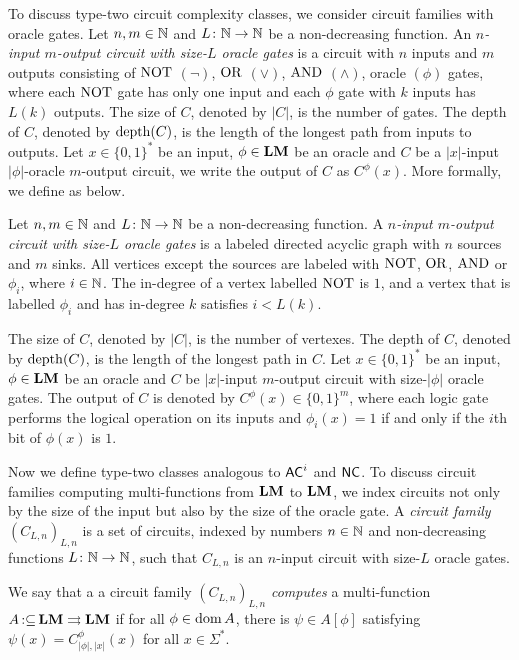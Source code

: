 \documentclass[envcountsame,orivec,oribibl]{llncs}
\newcommand{\pcolon}{\mathpunct{\,:\subseteq}}
\begin{document}
To discuss type-two circuit complexity classes,
we consider circuit families with oracle gates.
Let $n, m \in \mathbb N$ and $L \colon \mathbb N \to \mathbb N$ be a non-decreasing function.
An \emph{$n$-input $m$-output circuit with size-$L$ oracle gates} is a circuit with
$n$ inputs and $m$ outputs consisting of 
$\mathrm{NOT}$ $(\neg)$, $\mathrm{OR}$ $(\vee)$, $\mathrm{AND}$ $(\wedge)$, oracle $(\phi)$ gates,
where each $\mathrm{NOT}$ gate has only one input and each $\phi$ gate with $k$ inputs
has $L(k)$ outputs.
The size of $C$, denoted by $|C|$, is the number of gates.
The depth of $C$, denoted by $\mathop{\rm depth}(C)$, is the length of the longest path
from inputs to outputs.
Let $x \in \{0, 1\}^*$ be an input, $\phi \in \mathbf{LM}$ be an oracle and
$C$ be a $|x|$-input $|\phi|$-oracle $m$-output circuit,
we write the output of $C$ as $C^\phi(x)$.
More formally, we define as below.

\begin{definition}
Let $n, m \in \mathbb N$ and $L \colon \mathbb N \to \mathbb N$ be a non-decreasing function.
A \emph{$n$-input $m$-output circuit with size-$L$ oracle gates} is 
a labeled directed acyclic graph with $n$ sources and $m$ sinks.
All vertices except the sources are labeled with $\mathrm{NOT}$, $\mathrm{OR}$, $\mathrm{AND}$ 
or $\phi _i$, where $i \in \mathbb N$.
The in-degree of a vertex labelled $\mathrm{NOT}$ is $1$, and
a vertex that is labelled $\phi _i$ and has in-degree $k$ 
satisfies $i < L(k)$.

The size of $C$, denoted by $|C|$, is the number of vertexes.
The depth of $C$, denoted by $\mathop{\rm depth}(C)$, is the length of the longest path in $C$.
Let $x \in \{0, 1\}^*$ be an input, $\phi \in \mathbf{LM}$ be an oracle and
$C$ be $|x|$-input $m$-output circuit with size-$|\phi|$ oracle gates.
The output of $C$ is denoted by $C^\phi(x) \in \{0, 1\}^m$,
where each logic gate performs the logical operation on its inputs
and $\phi_i(x) = 1$ if and only if the $i$th bit of $\phi(x)$ is $1$.
\end{definition}


Now we define type-two classes analogous to 
$\mathsf{AC}^i$ and $\mathsf{NC}$.
To discuss circuit families computing multi-functions from $\mathbf{LM}$ to $\mathbf{LM}$,
we index circuits not only by the size of the input but also by the size of the oracle gate.
A {\em circuit family $(C_{L,n})_{L,n}$} is a set of circuits, 
indexed by numbers $n \in \mathbb N$ and non-decreasing functions $L \colon \mathbb N \to \mathbb N$,
such that $C_{L, n}$ is an $n$-input circuit with size-$L$ oracle gates.


\begin{definition}
 We say that a a circuit family $(C_{L,n})_{L,n}$ 
\emph{computes} a multi-function 
 $A \pcolon \LM \rightrightarrows \LM$ if for all $\phi \in \mathop{\rm dom} A$, 
 there is $\psi \in A[\phi]$ satisfying $\psi(x) = C_{|\phi|, |x|}^\phi(x)$
 for all $x \in \Sigma^*$.
\end{definition}
\end{document}
